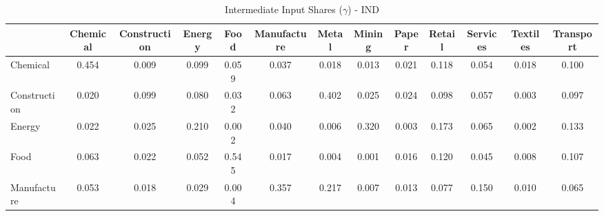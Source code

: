 \begin{table}[htbp]
\centering
\caption{Intermediate Input Shares ($\gamma$) - IND} 
\label{tab:gamma_IND}
\begin{tabular}{lcccccccccccc}
  \hline
 & Chemical & Construction & Energy & Food & Manufacture & Metal & Mining & Paper & Retail & Services & Textiles & Transport \\ 
  \hline
Chemical & \textcolor[RGB]{2,1,253}{0.454} & \textcolor[RGB]{205,133,50}{0.009} & \textcolor[RGB]{66,42,189}{0.099} & \textcolor[RGB]{122,79,133}{0.059} & \textcolor[RGB]{145,94,110}{0.037} & \textcolor[RGB]{175,113,80}{0.018} & \textcolor[RGB]{195,126,60}{0.013} & \textcolor[RGB]{172,111,83}{0.021} & \textcolor[RGB]{51,33,204}{0.118} & \textcolor[RGB]{126,81,129}{0.054} & \textcolor[RGB]{179,116,76}{0.018} & \textcolor[RGB]{62,40,193}{0.100} \\ 
  Construction & \textcolor[RGB]{174,112,81}{0.020} & \textcolor[RGB]{67,44,188}{0.099} & \textcolor[RGB]{90,58,165}{0.080} & \textcolor[RGB]{147,95,108}{0.032} & \textcolor[RGB]{117,76,138}{0.063} & \textcolor[RGB]{7,5,248}{0.402} & \textcolor[RGB]{156,101,99}{0.025} & \textcolor[RGB]{161,104,94}{0.024} & \textcolor[RGB]{71,46,184}{0.098} & \textcolor[RGB]{124,80,131}{0.057} & \textcolor[RGB]{234,151,21}{0.003} & \textcolor[RGB]{73,47,182}{0.097} \\ 
  Energy & \textcolor[RGB]{166,108,89}{0.022} & \textcolor[RGB]{158,102,97}{0.025} & \textcolor[RGB]{23,15,232}{0.210} & \textcolor[RGB]{241,156,14}{0.002} & \textcolor[RGB]{142,92,113}{0.040} & \textcolor[RGB]{225,146,30}{0.006} & \textcolor[RGB]{16,10,239}{0.320} & \textcolor[RGB]{232,150,23}{0.003} & \textcolor[RGB]{25,16,230}{0.173} & \textcolor[RGB]{108,70,147}{0.065} & \textcolor[RGB]{244,158,11}{0.002} & \textcolor[RGB]{42,27,212}{0.133} \\ 
  Food & \textcolor[RGB]{113,73,142}{0.063} & \textcolor[RGB]{165,107,90}{0.022} & \textcolor[RGB]{129,84,126}{0.052} & \textcolor[RGB]{0,0,255}{0.545} & \textcolor[RGB]{181,117,74}{0.017} & \textcolor[RGB]{228,148,27}{0.004} & \textcolor[RGB]{246,159,9}{0.001} & \textcolor[RGB]{188,121,67}{0.016} & \textcolor[RGB]{50,32,205}{0.120} & \textcolor[RGB]{138,89,117}{0.045} & \textcolor[RGB]{212,138,42}{0.008} & \textcolor[RGB]{58,38,197}{0.107} \\ 
  Manufacture & \textcolor[RGB]{128,82,128}{0.053} & \textcolor[RGB]{177,115,78}{0.018} & \textcolor[RGB]{151,97,104}{0.029} & \textcolor[RGB]{230,149,25}{0.004} & \textcolor[RGB]{12,8,243}{0.357} & \textcolor[RGB]{21,14,234}{0.217} & \textcolor[RGB]{223,144,32}{0.007} & \textcolor[RGB]{197,127,58}{0.013} & \textcolor[RGB]{92,60,163}{0.077} & \textcolor[RGB]{37,24,218}{0.150} & \textcolor[RGB]{200,129,55}{0.010} & \textcolor[RGB]{112,72,143}{0.065} \\ 

\end{tabular}
\end{table}
